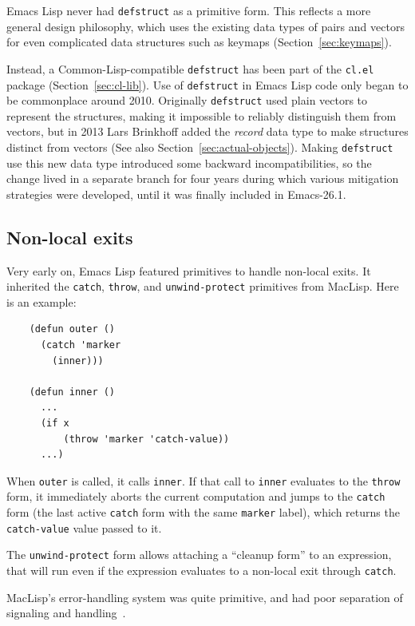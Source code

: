 \documentclass[format=acmsmall, review]{acmart}
\newcommand \Elisp {Emacs Lisp}
\begin{document}
\Elisp{} never had \texttt{defstruct} as a primitive form.  This
reflects a more general design philosophy, which uses the existing
data types of pairs and vectors for even complicated data structures
such as keymaps (Section~\ref{sec:keymaps}).

Instead, a Common-Lisp-compatible \texttt{defstruct} has been part of the
\texttt{cl.el} package (Section~\ref{sec:cl-lib}).  Use of
\texttt{defstruct} in \Elisp{} code only began to be commonplace around
2010.  Originally \texttt{defstruct} used plain vectors to represent the
structures, making it impossible to reliably distinguish them from vectors,
but in 2013 Lars Brinkhoff added the \emph{record} data type to make
structures distinct from vectors (See also
Section~\ref{sec:actual-objects}).  Making \texttt{defstruct} use this new
data type introduced some backward incompatibilities, so the change lived in
a separate branch for four years during which various mitigation strategies
were developed, until it was finally included in Emacs-26.1.

\subsection{Non-local exits}
\label{sec:non-local-exits}

Very early on, \Elisp{} featured primitives to handle
non-local exits.  It inherited the \texttt{catch}, \texttt{throw}, and
\texttt{unwind-protect} primitives from MacLisp.  Here is an example:
%
\begin{verbatim}
    (defun outer ()
      (catch 'marker
        (inner)))
    
    (defun inner ()
      ...
      (if x
          (throw 'marker 'catch-value))
      ...)
\end{verbatim}
%
When \texttt{outer} is called, it calls \texttt{inner}.  If that call
to \texttt{inner} evaluates to the \texttt{throw} form, it immediately
aborts the current computation and jumps to the \texttt{catch} form
(the last active \texttt{catch} form with the same \texttt{marker}
label), which returns the \texttt{catch-value} value passed to it.

The \texttt{unwind-protect} form allows attaching a ``cleanup form''
to an expression, that will run even if the expression evaluates to a
non-local exit through \texttt{catch}.

MacLisp's error-handling system was quite primitive, and had poor separation
of signaling and handling~\cite{Pitman2001}.
\end{document}
